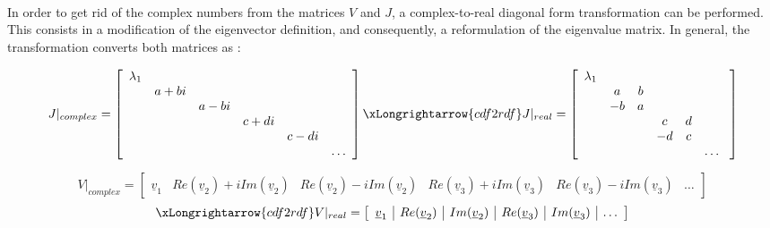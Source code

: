 			\paragraph{  \\}
			\indent In order to get rid of the complex numbers from the matrices $V$ and $J$, a complex-to-real diagonal form transformation can be performed. This consists in a modification of the eigenvector definition, and consequently, a reformulation of the eigenvalue matrix. In general, the transformation converts both matrices as \cite{cdf2rdf}:
			\begin{changemargin}{-2.6cm}{-1cm}
			\begin{equation}
			J\rvert_{complex} = \left[ \begin{array}{cccccc}
			\lambda_1 	& 			& 			& 			& 			& \\
						& a + bi 	& 			& 			& 			& \\
						&			& a - bi 	& 			& 			& \\
						&			&  			& c + di	& 			& \\
						&			&  			& 			& c - di	& \\
						&			&  			& 			&			& \ldots												
			\end{array}\right] \xLongrightarrow{cdf2rdf} J\rvert_{real} = \left[ \begin{array}{cccccc}
			\lambda_1 	& 			& 			& 			& 			& \\
						& a  		& b			& 			& 			& \\
						& -b		& a 		& 			& 			& \\
						&			&  			& c 		& d			& \\
						&			&  			& -d		& c 		& \\
						&			&  			& 			&			& \ldots\
			\end{array}\right]
			\label{eqCh2:cdf2rdf_lambda}
			\end{equation}
			\end{changemargin}
			\[
			V\rvert_{complex} = \left[ \begin{array}{c|c|c|c|c|c}
			\underline{v}_1 	& Re(\underline{v}_2) + i Im(\underline{v}_2)	& 	Re(\underline{v}_2) - i Im(\underline{v}_2)	& 	Re(\underline{v}_3) + i Im(\underline{v}_3)	& 	Re(\underline{v}_3)  - i Im(\underline{v}_3)	& \ldots											
			\end{array}\right]
			\]
			\begin{equation}
			\xLongrightarrow{cdf2rdf} V\rvert_{real} = \left[ \begin{array}{c|c|c|c|c|c}
			\underline{v}_1 	& Re(\underline{v}_2) 	& 	Im(\underline{v}_2)	& 	Re(\underline{v}_3)	& Im(\underline{v}_3)	& \ldots
			\end{array}\right]
			\label{eqCh2:cdf2rdf_V}
			\end{equation}
